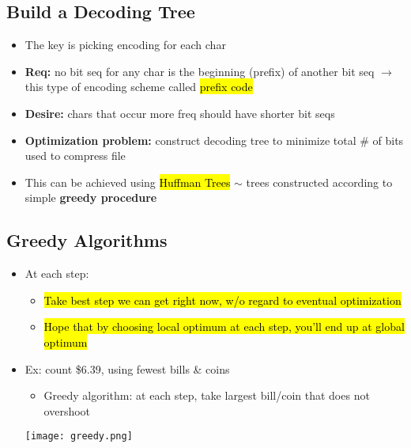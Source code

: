\documentclass{article}
\begin{document}
\subsection{Build a Decoding Tree}
    \begin{multicols}{2}
        \begin{itemize}
            \item The key is picking encoding for each char
            \item \textbf{Req:} no bit seq for any char is the beginning (prefix) of another bit seq $\rightarrow$ this type of encoding scheme called \hl{prefix code}
            \item \textbf{Desire:} chars that occur more freq should have shorter bit seqs
            \item \textbf{Optimization problem:} construct decoding tree to minimize total \# of bits used to compress file
            \item This can be achieved using \hl{Huffman Trees} $\sim$ trees constructed according to simple \textbf{greedy procedure}
        \end{itemize}
    \end{multicols}

\subsection{Greedy Algorithms}
    \begin{multicols}{2}
            \begin{itemize}
                \item At each step:
                    \begin{itemize}
                        \item \hl{Take best step we can get right now, w/o regard to eventual optimization}
                        \item \hl{Hope that by choosing local optimum at each step, you'll end up at global optimum}
                    \end{itemize}
                \item Ex: count \$6.39, using fewest bills \& coins
                    \begin{itemize}
                        \item Greedy algorithm: at each step, take largest bill/coin that does not overshoot
                    \end{itemize}
                \hspace{4em} \texttt{[image: greedy.png]}
            \end{itemize}
    \end{multicols}
\end{document}

